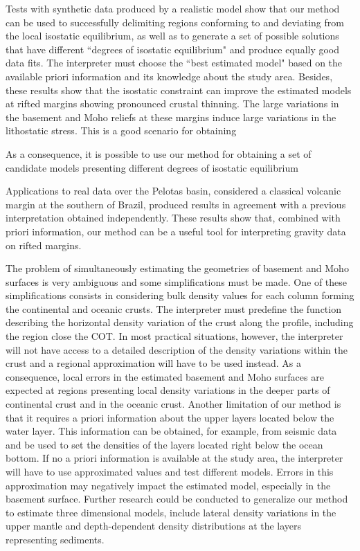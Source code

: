 \documentclass[manuscript,revised]{geophysics}
\begin{document}
Tests with synthetic data produced by a realistic model show that our method can 
be used to successfully delimiting regions conforming to and deviating from the local 
isostatic equilibrium, as well as to generate a set of possible solutions that have 
different ``degrees of isostatic equilibrium" and produce equally good data fits.
The interpreter must choose the ``best estimated model" based on the 
available priori information and its knowledge about the study area.
Besides, these results show that the isostatic constraint can improve 
the estimated models at rifted margins showing pronounced crustal thinning.
The large variations in the basement and Moho reliefs at these margins induce
large variations in the lithostatic stress. 
This is a good scenario for obtaining 

As a consequence, it is possible to
use our method for obtaining a set of candidate models presenting different degrees of
isostatic equilibrium

Applications to real data over the Pelotas basin, considered a classical volcanic
margin at the southern of Brazil, produced results in agreement with a previous 
interpretation obtained independently.
These results show that, combined with priori information, our method can be a 
useful tool for interpreting gravity data on rifted margins.

The problem of simultaneously estimating the geometries of basement and Moho surfaces
is very ambiguous and some simplifications must be made. 
One of these simplifications consists in considering bulk density 
values for each column forming the continental and oceanic crusts. 
The interpreter must predefine the function describing the horizontal density
variation of the crust along the profile, including the region close the COT.
In most practical situations, however, the interpreter will not have access to a detailed
description of the density variations within the crust and a regional approximation
will have to be used instead.
As a consequence, local errors in the estimated basement and Moho surfaces are expected 
at regions presenting local density variations in the deeper parts of continental crust 
and in the oceanic crust.
Another limitation of our method is that it requires a priori information about the
upper layers located below the water layer.
This information can be obtained, for example, from seismic data and be used to set
the densities of the layers located right below the ocean bottom.
If no a priori information is available at the study area, the interpreter will have to use
approximated values and test different models.
Errors in this approximation may negatively impact the estimated model, especially in 
the basement surface.
Further research could be conducted to generalize our method to estimate
three dimensional models, include lateral density variations in the upper mantle
and depth-dependent density distributions at the layers representing sediments.
\end{document}
